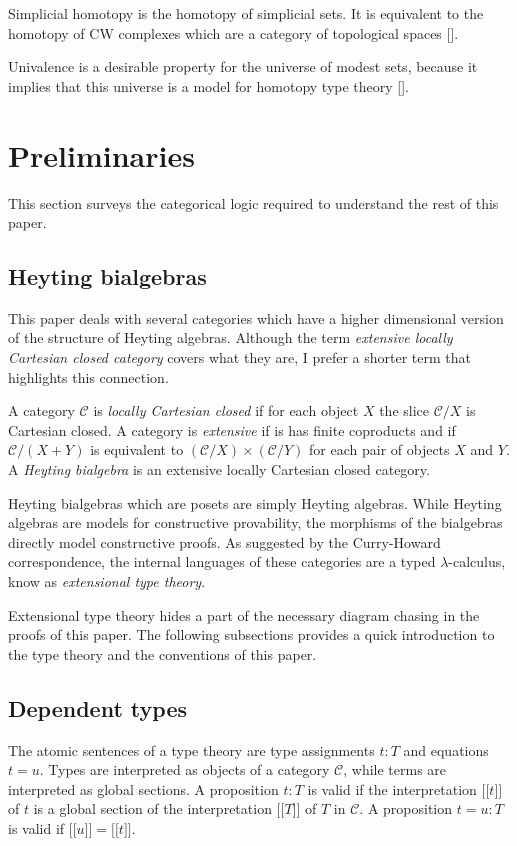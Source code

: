 \documentclass{tac}
\newcommand\cat\mathcal
\newcommand\of{:}
\newcommand\db[1]{{[\![}#1{]\!]}}
\newcommand\citep[1]{[\cite{#1}]}
\begin{document}
Simplicial homotopy is the homotopy of simplicial sets. It is equivalent to the homotopy of CW complexes which are a category of topological spaces \citep{Hovey99,GJSHT}.

Univalence is a desirable property for the universe of modest sets, because it implies that this universe is a model for homotopy type theory \citep{hottbook,KLV12}.

\section{Preliminaries}
This section surveys the categorical logic required to understand the rest of this paper.

\subsection{Heyting bialgebras}
This paper deals with several categories which have a higher dimensional version of the structure of Heyting algebras. Although the term \emph{extensive locally Cartesian closed category} covers what they are, I prefer a shorter term that highlights this connection.

\begin{definition} A category $\cat C$ is \emph{locally Cartesian closed} if for each object $X$ the slice $\cat C/X$ is Cartesian closed. A category is \emph{extensive} if is has finite coproducts and if $\cat C/(X+Y)$ is equivalent to $(\cat C/X)\times(\cat C/Y)$ for each pair of objects $X$ and $Y$. A \emph{Heyting bialgebra} is an extensive locally Cartesian closed category. \label{Heyting bialgebra}
\end{definition}

Heyting bialgebras which are posets are simply Heyting algebras. While Heyting algebras are models for constructive provability, the morphisms of the bialgebras directly model constructive proofs. As suggested by the Curry-Howard correspondence, the internal languages of these categories are a typed $\lambda$-calculus, know as \emph{extensional type theory}.

Extensional type theory hides a part of the necessary diagram chasing in the proofs of this paper. The following subsections provides a quick introduction to the type theory and the conventions of this paper.

\subsection{Dependent types}
The atomic sentences of a type theory are type assignments $t\of T$ and equations $t=u$. Types are interpreted as objects of a category $\cat C$, while terms are interpreted as global sections. A proposition $t\of T$ is valid if the interpretation $\db t$ of $t$ is a global section of the interpretation $\db T$ of $T$ in $\cat C$. A proposition $t=u\of T$ is valid if $\db u=\db t$. 
\end{document}
